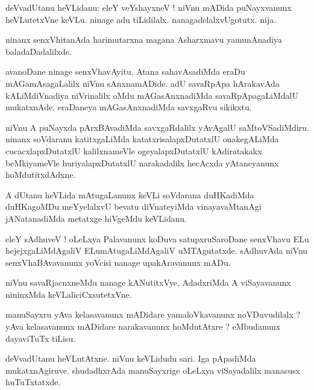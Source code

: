 \documentclass{article}
\begin{document}
\begin{mn}
deVvadUtanu heVLidanu: eleY veYshayxneV ! niVnu mADida puNayxvanunx heVLutetxVne keVLu. ninage 
adu tiLidilalx. nanagadelalxvUgotutx. nija.
\end{mn}

\begin{mn}
ninanx senxVhitanAda harimutarxna magana Asharxmavu yamunAnadiya baladaDadalilxde.
\end{mn}

\begin{mn}
avanoDane ninage senxVhavAyitu. Atana sahavAsadiMda eraDu mAGamAsagaLalilx niVnu sAnxnamADide. 
adU savaRpApa hArakavAda kALiMdiVnadiya niVrinalilx oMdu mAGasAnxnadiMda  savaRpApagaLiMdalU
mukatxnAde. eraDaneya mAGasAnxnadiMda savxgaRvu sikikxtu.
\end{mn}

\begin{mn}
niVnu A puNayxda pArxBAvadiMda savxgaRdalilx yAvAgalU saMtoVSadiMdiru. ninanx soVdaranu 
katitxgaLiMda katatxrisalapxDutatxlU onakegALiMda cucacxlapxDutatxlU kalilxnameVle 
ogeyalapxDutatxlU kAdiratakakx beMkiyameVle huriyalapxDutatxlU narakadalilx hecAcxda yAtaneyanunx
hoMdutitxdAdxne.
\end{mn}

\begin{mn}
A dUtanu heVLida mAtugaLanunx keVLi soVdarana duHKadiMda duHKagoMDu meYyelalxvU bevatu 
diVnateyiMda vinayavaMtanAgi jANatanadiMda metatxge hiVgeMdu keVLidanu.
\end{mn}


\begin{mn}
eleY sAdhuveV ! oLeLxya Palavanunx koDuva satupxruSaroDane senxVhavu ELu hejejxgaLiMdAgaliV 
ELumAtugaLiMdAgaliV uMTAgutatxde. sAdhuvAda niVnu senxVhaBAvavanunx yoVcisi nanage upakAravanunx 
mADu.
\end{mn}

\begin{mn}
niVnu savaRjacnxneMdu nanage kANutitxVye, AdadxriMda A viSayavanunx nininxMda keVLaliciCxsutetxVne. 
\end{mn}

\begin{mn}
manuSayxru yAva kelasavanunx mADidare yamaloVkavanunx noVDuvudilalx ? yAva kelasavanunx mADidare 
narakavanunx hoMdutAtxre ? eMbudanunx dayaviTuTx tiLisu.
\end{mn}

\begin{mn}
deVvadUtanu heVLutAtxne. niVnu keVLidudu sari. Iga pApadiMda mukatxnAgiruve. shudadhxrAda 
manuSayxrige oLeLxya viSayadalilx manasusx huTuTxtatxde.
\end{mn}
\end{document}
